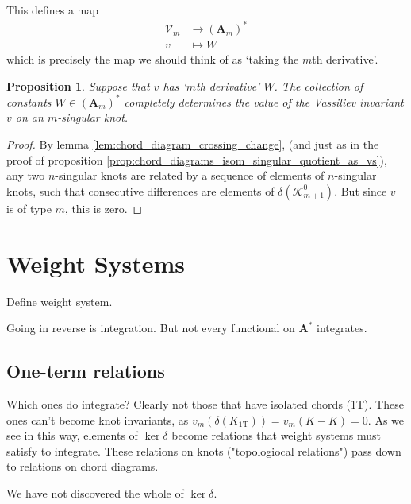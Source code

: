 \documentclass[12pt]{report}
\theoremstyle{regular}
\numberwithin{clause}{chapter}
\newtheorem{proposition}[clause]{Proposition}
\newcommand{\scaffold}[1]{
\begin{mdframed}[style=scaffold]
        {\color{teal}#1}
\end{mdframed}
}
\begin{document}
        This defines a map
        \begin{align*}
                \mathcal{V}_{m} &\longrightarrow (\mathbf{A}_{m})^{\ast} \\
                v               & \longmapsto W
        \end{align*}
        which is precisely the map we should think of as `taking the \(m\)th derivative'.

        \begin{proposition}
                Suppose that \(v\) has `\(m\)th derivative' \(W\). The collection of constants \(W \in (\mathbf{A}_{m})^{\ast}\) completely determines the value of the Vassiliev invariant \(v\) on an \(m\)-singular knot.
        \end{proposition}

        \begin{proof}
                By lemma \ref{lem:chord_diagram_crossing_change}, (and just as in the proof of proposition \ref{prop:chord_diagrams_isom_singular_quotient_as_vs}), any two \(n\)-singular knots are related by a sequence of elements of \(n\)-singular knots, such that consecutive differences are elements of \(\delta(\mathcal{K}^{0}_{m + 1})\). But since \(v\) is of type \(m\), this is zero.
        \end{proof}

        \section{Weight Systems}

        \scaffold{Define weight system.}

        \scaffold{Going in reverse is integration. But not every functional on \(\mathbf{A}^{\ast}\) integrates.}

        \subsection{One-term relations}

        \scaffold{Which ones do integrate? Clearly not those that have isolated chords (1T). These ones can't become knot invariants, as \(v_{m}(\delta(K_{\text{1T}})) = v_{m}(K - K) = 0\). As we see in this way, elements of \(\ker \delta\) become relations that weight systems must satisfy to integrate. These relations on knots ("topologiocal relations") pass down to relations on chord diagrams.}

        \scaffold{We have not discovered the whole of \(\ker \delta\).}
\end{document}
